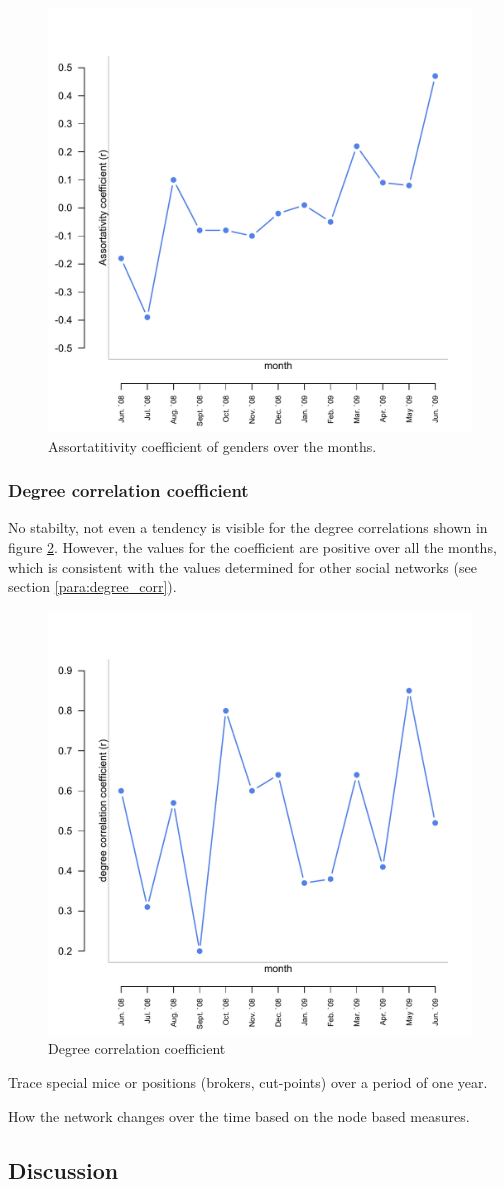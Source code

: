 \begin{figure}[htpb]
\begin{center}
  \includegraphics[width=.6\textwidth]{assets/pdf/long_gender_corr.pdf}
  \caption[Assortatitivity coefficient of genders over the monts]{Assortatitivity coefficient of genders over the months.}
  \label{fig:long_gender_corr}
\end{center}
\end{figure} 


\subsubsection*{Degree correlation coefficient}

No stabilty, not even a tendency is visible for the degree correlations shown in figure \ref{fig:long_degree_cor}. However, the values for the coefficient are positive over all the months, which is consistent with the values determined for other social networks (see section \ref{para:degree_corr}). 

\begin{figure}[htpb]
\begin{center}
  \includegraphics[width=.6\textwidth]{assets/pdf/long_degree_corr.pdf}
  \caption[Degree correlation coefficient]{Degree correlation coefficient}
  \label{fig:long_degree_cor}
\end{center}
\end{figure} 


\begin{mylist}
\item Trace special mice or positions (brokers, cut-points) over a period of one year.
\item How the network changes over the time based on the node based measures.
\end{mylist} 

\subsection{Discussion}
\label{subsec:discussion}


